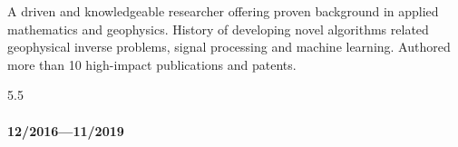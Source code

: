 \documentclass[9pt]{developercv} %
\begin{document}
\vspace{0.5cm}



\begin{minipage}[t]{0.4\textwidth} %
	\vspace{\baselineskip} %
	A driven and knowledgeable researcher offering proven background in applied mathematics and geophysics. History of developing novel algorithms related geophysical inverse problems, signal processing and machine learning.
	Authored more than 10 high-impact publications and patents.

\end{minipage}
\hfill %
\begin{minipage}[t]{0.5\textwidth} %
	\vspace{-\baselineskip} %
	\begin{barchart}{5.5}
	\end{barchart}
\end{minipage}

\begin{center}
\end{center}

\label{research-positions}

\paragraph{12/2016---11/2019}\label{section}
\end{document}
